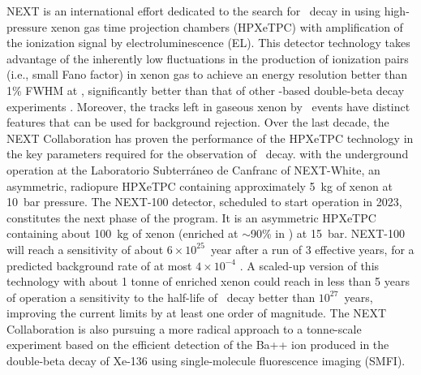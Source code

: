 NEXT \cite{NEXT:2015wlq, NEXT:2020amj} is an international effort dedicated to the search for \bbonu\ decay in  using high-pressure xenon gas time projection chambers (HPXeTPC) with amplification of the ionization signal by electroluminescence (EL). This detector technology takes advantage of the inherently low fluctuations in the production of ionization pairs (i.e., small Fano factor) in xenon gas to achieve an energy resolution better than 1\% FWHM at \Qbb, significantly better than that of other -based double-beta decay experiments \cite{Nygren:2009zz}. Moreover, the tracks left in gaseous xenon by \bbonu\ events have distinct features that can be used for background rejection. Over the last decade, the NEXT Collaboration has proven the performance of the HPXeTPC technology in the key parameters required for the observation of \bbonu\ decay. with the underground operation at the Laboratorio Subterráneo de Canfranc of NEXT-{\sc White}, an asymmetric, radiopure HPXeTPC containing approximately 5~kg of xenon at 10~bar pressure. 
The NEXT-100 detector, scheduled to start operation in 2023, constitutes the next phase of the program. It is an asymmetric HPXeTPC containing about 100~kg of xenon (enriched at $\sim$90\% in ) at 15~bar. NEXT-100 will reach a sensitivity of about $6\times10^{25}$~year after a run of 3 effective years, for a predicted background rate of at most $4\times10^{-4}$ \ckky. A scaled-up version of this technology with about 1 tonne of enriched xenon could reach in less than 5 years of operation a sensitivity to the half-life of \bbonu\ decay better than $10^{27}$~years, improving the current limits by at least one order of magnitude. The NEXT Collaboration is also pursuing a more radical approach to a tonne-scale experiment based on the efficient detection of the Ba++ ion produced in the double-beta decay of Xe-136 using single-molecule fluorescence imaging (SMFI).